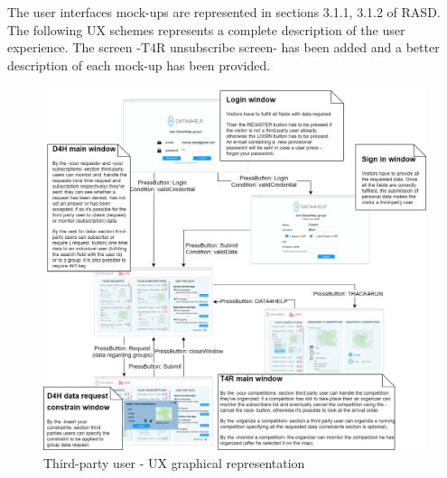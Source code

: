 The user interfaces mock-ups are represented in sections 3.1.1, 3.1.2 of RASD. The following UX schemes represents a complete description of the user experience. The screen -T4R unsubscribe screen- has been added and a better description of each mock-up has been provided.
\begin{figure}[H]
\caption{Third-party user - UX graphical representation}
\includegraphics[width = \textwidth]{sections/userInterfacesGraphs/UserExperienceDesktop.png}
\end{figure}
\clearpage
